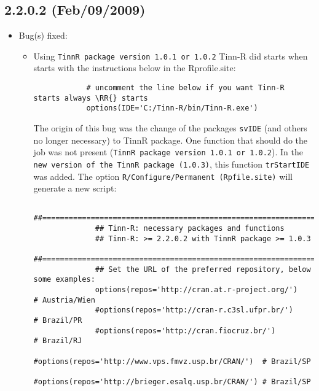 \subsection*{2.2.0.2 (Feb/09/2009)}
\begin{itemize}
  \item Bug(s) fixed:
    \begin{itemize}
      \item Using \texttt{TinnR package version 1.0.1 or 1.0.2} Tinn-R did starts
        when \RR{} starts with the instructions below in the Rprofile.site:

        \begin{Scode}
          \begin{verbatim}
            # uncomment the line below if you want Tinn-R starts always \RR{} starts
            options(IDE='C:/Tinn-R/bin/Tinn-R.exe')
          \end{verbatim}
        \end{Scode}

        The origin of this bug was the change of the packages \texttt{svIDE}
        (and others no longer necessary) to TinnR package. One function that
        should do the job was not present (\texttt{TinnR package version 1.0.1
          or 1.0.2}). In the \texttt{new version of the TinnR package (1.0.3)},
        this function \texttt{trStartIDE} was added. The option
        \texttt{R/Configure/Permanent (Rpfile.site)} will generate a new
        script:

        {\footnotesize                                                                         
          {\color {darkred}                                                                    
            \begin{verbatim}                                                                   
              ##===============================================================                
              ## Tinn-R: necessary packages and functions                                      
              ## Tinn-R: >= 2.2.0.2 with TinnR package >= 1.0.3                                
              ##===============================================================                
              ## Set the URL of the preferred repository, below some examples:                 
              options(repos='http://cran.at.r-project.org/')      # Austria/Wien               
              #options(repos='http://cran-r.c3sl.ufpr.br/')       # Brazil/PR                  
              #options(repos='http://cran.fiocruz.br/')           # Brazil/RJ                  
              #options(repos='http://www.vps.fmvz.usp.br/CRAN/')  # Brazil/SP                  
              #options(repos='http://brieger.esalq.usp.br/CRAN/') # Brazil/SP                  
                                                                                               

\end{verbatim}}}
\end{itemize}
\end{itemize}
